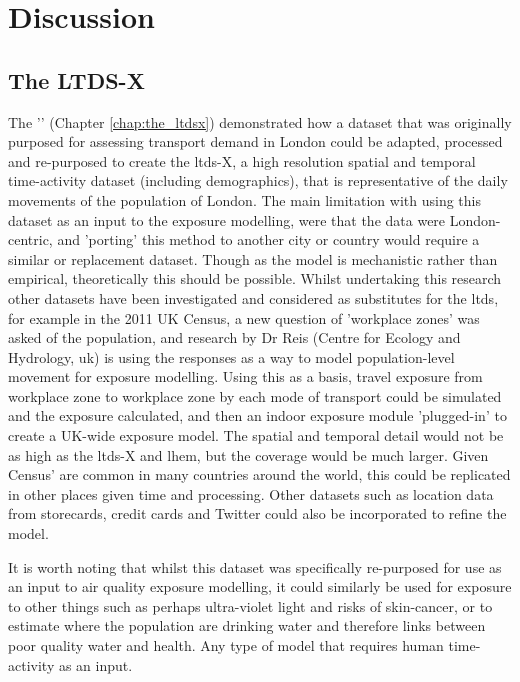 \newpage
\section{Discussion}
\label{sec:wrap_up_discussion}

\subsection{The LTDS-X}
\label{ltds_discussion_wrapup}


The '' (Chapter \ref{chap:the_ltdsx}) demonstrated how a dataset that was originally purposed for assessing transport demand in London could be adapted, processed and re-purposed to create the \gls{ltds}-X, a high resolution spatial and temporal time-activity dataset (including demographics), that is representative of the daily movements of the population of London. The main limitation with using this dataset as an input to the exposure modelling, were that the data were London-centric, and 'porting' this method to another city or country would require a similar or replacement dataset. Though as the model is mechanistic rather than empirical, theoretically this should be possible. Whilst undertaking this research other datasets have been investigated and considered as substitutes for the \gls{ltds}, for example in the 2011 UK Census, a new question of 'workplace zones' was asked of the population, and research by Dr Reis (Centre for Ecology and Hydrology, \gls{uk}) is using the responses as a way to model population-level movement for exposure modelling. Using this as a basis, travel exposure from workplace zone to workplace zone by each mode of transport could be simulated and the exposure calculated, and then an indoor exposure module 'plugged-in' to create a UK-wide exposure model. The spatial and temporal detail would not be as high as the \gls{ltds}-X and \gls{lhem}, but the coverage would be much larger. Given Census' are common in many countries around the world, this could be replicated in other places given time and processing. Other datasets such as location data from storecards, credit cards and Twitter could also be incorporated to refine the model.

It is worth noting that whilst this dataset was specifically re-purposed for use as an input to air quality exposure modelling, it could similarly be used for exposure to other things such as perhaps ultra-violet light and risks of skin-cancer, or to estimate where the population are drinking water and therefore links between poor quality water and health. Any type of model that requires human time-activity as an input.

